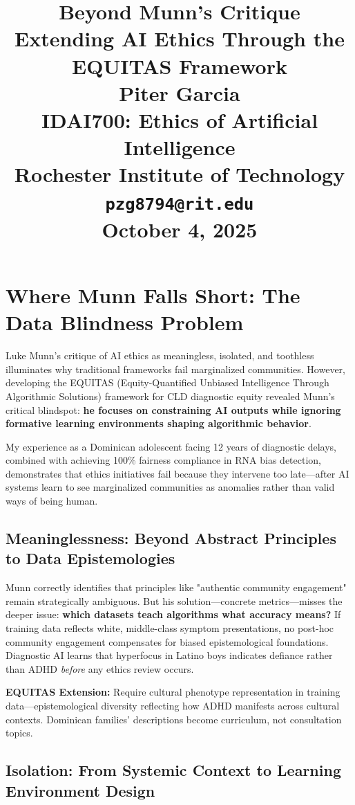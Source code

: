 \documentclass[11pt,twoside]{article}
\title{
\vspace*{2in}
\textbf{\Huge Beyond Munn's Critique}\\[1em]
\Large Extending AI Ethics Through the EQUITAS Framework\\[2em]
\large Piter Garcia\\
\small IDAI700: Ethics of Artificial Intelligence\\
Rochester Institute of Technology\\
\texttt{pzg8794@rit.edu}\\[3em]
\large October 4, 2025
}
\author{}
\date{}
\begin{document}
\thispagestyle{empty}
\maketitle
\newpage

\pagestyle{fancy}

\newpage
\section{Where Munn Falls Short: The Data Blindness Problem}

Luke Munn's critique of AI ethics as meaningless, isolated, and toothless illuminates why traditional frameworks fail marginalized communities. However, developing the EQUITAS (Equity-Quantified Unbiased Intelligence Through Algorithmic Solutions) framework for CLD diagnostic equity revealed Munn's critical blindspot: \textbf{he focuses on constraining AI outputs while ignoring formative learning environments shaping algorithmic behavior}.

My experience as a Dominican adolescent facing 12 years of diagnostic delays, combined with achieving 100\% fairness compliance in RNA bias detection, demonstrates that ethics initiatives fail because they intervene too late—after AI systems learn to see marginalized communities as anomalies rather than valid ways of being human.

\subsection{Meaninglessness: Beyond Abstract Principles to Data Epistemologies}

Munn correctly identifies that principles like "authentic community engagement" remain strategically ambiguous. But his solution—concrete metrics—misses the deeper issue: \textbf{which datasets teach algorithms what accuracy means?} If training data reflects white, middle-class symptom presentations, no post-hoc community engagement compensates for biased epistemological foundations. Diagnostic AI learns that hyperfocus in Latino boys indicates defiance rather than ADHD \textit{before} any ethics review occurs.

\textbf{EQUITAS Extension:} Require cultural phenotype representation in training data—epistemological diversity reflecting how ADHD manifests across cultural contexts. Dominican families' descriptions become curriculum, not consultation topics.

\subsection{Isolation: From Systemic Context to Learning Environment Design}
\end{document}
